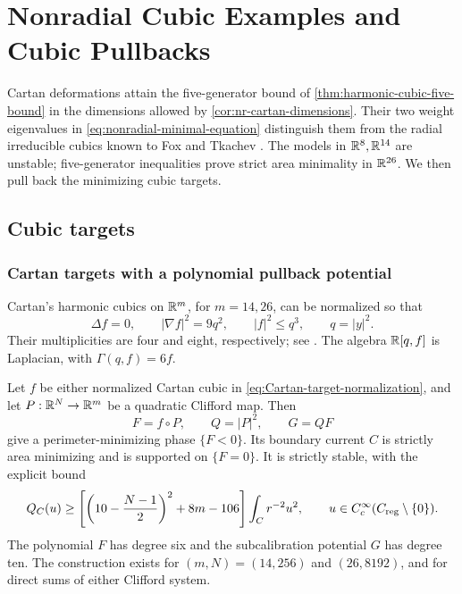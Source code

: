 \section[Nonradial Cubics and Pullbacks]{Nonradial Cubic Examples and Cubic Pullbacks}
\label{sec:nonradial-examples}

Cartan deformations attain the five-generator bound of
\cref{thm:harmonic-cubic-five-bound} in the dimensions allowed by
\cref{cor:nr-cartan-dimensions}. Their two weight eigenvalues in
\eqref{eq:nonradial-minimal-equation} distinguish them from the radial
irreducible cubics known to Fox and Tkachev
\cite[Introduction and Section~2.1]{FoxTkachev24}.
The models in \(\mathbb R^8,\mathbb R^{14}\) are unstable; five-generator inequalities
prove strict area minimality in \(\mathbb R^{26}\). We then pull back the
minimizing cubic targets.



\subsection{Cubic targets}



\subsubsection{Cartan targets with a polynomial pullback potential}

Cartan's harmonic cubics on \(\mathbb R^m\), for \(m=14,26\), can be
normalized so that
\begin{equation}\label{eq:Cartan-target-normalization}
 \Delta f=0,\qquad |\nabla f|^2=9q^2,\qquad |f|^2\leq q^3,
 \qquad q=|y|^2.
\end{equation}
Their multiplicities are four and eight, respectively; see
\cite[Theorems~2.5 and~4.1]{Chi20}.  The algebra \(\mathbb R[q,f]\) is
Laplacian, with \(\Gamma(q,f)=6f\).

\begin{theorem}
\label{thm:cartan-pullback}
Let \(f\) be either normalized Cartan cubic in
\eqref{eq:Cartan-target-normalization}, and let
\(P:\mathbb R^N\to\mathbb R^m\) be a quadratic Clifford map.  Then
\[
 F=f\circ P,\qquad Q=|P|^2,\qquad G=QF
\]
give a perimeter-minimizing phase \(\{F<0\}\).
Its boundary current \(C\) is strictly area minimizing and is supported
on \(\{F=0\}\). It is strictly stable, with the explicit bound
\begin{equation}\label{eq:Cartan-pullback-Hardy}
 Q_C(u)\geq
 \left[\left(10-\frac{N-1}{2}\right)^2+8m-106\right]
 \int_Cr^{-2}u^2,
 \qquad u\in C_c^\infty(C_{\mathrm{reg}}\setminus\{0\}).
\end{equation}
The polynomial \(F\) has degree six and the
subcalibration potential \(G\) has degree ten.  The construction
exists for \((m,N)=(14,256)\) and \((26,8192)\), and for direct
sums of either Clifford system.
\end{theorem}

